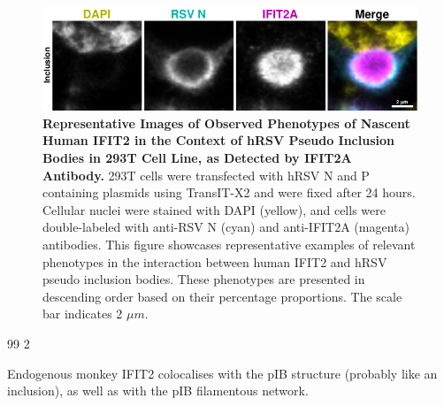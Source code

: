 \begin{figure}
    \centering
    \includegraphics[width=1\linewidth]{08. Chapter 3/Figs/03. pIB/03. IFIT2/02. IFIT2A/03. i2a-293t-hnhp.pdf} 
    \caption[Representative Images of Observed Phenotypes of Nascent Human IFIT2 in the Context of hRSV Pseudo Inclusion Bodies in 293T Cell Line, as Detected by IFIT2A Antibody.]{\textbf{Representative Images of Observed Phenotypes of Nascent Human IFIT2 in the Context of hRSV Pseudo Inclusion Bodies in 293T Cell Line, as Detected by IFIT2A Antibody.} 293T cells were transfected with hRSV N and P containing plasmids using TransIT-X2 and were fixed after 24 hours. Cellular nuclei were stained with DAPI (yellow), and cells were double-labeled with anti-RSV N (cyan) and anti-IFIT2A (magenta) antibodies. This figure showcases representative examples of relevant phenotypes in the interaction between human IFIT2 and hRSV pseudo inclusion bodies. These phenotypes are presented in descending order based on their percentage proportions. The scale bar indicates 2 \(\mu m\).}
    \label{fig:Representative Images of Observed Phenotypes of Nascent Human IFIT2 in the Context of hRSV Pseudo Inclusion Bodies in 293T Cell Line, as Detected by IFIT2A Antibody}
\end{figure}

99
2

Endogenous monkey IFIT2 colocalises with the pIB structure (probably like an inclusion), as well as with the pIB filamentous network.

